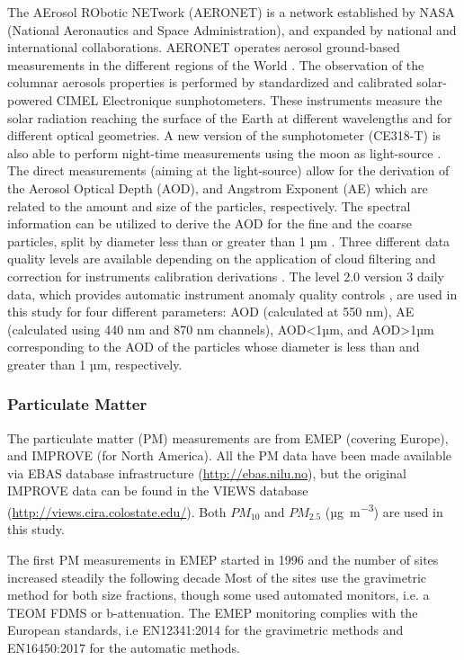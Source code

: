 \documentclass[journal abbreviation, manuscript]{copernicus}
\begin{document}
The AErosol RObotic NETwork (AERONET) is a network established by NASA (National Aeronautics and Space Administration), and expanded by national and international collaborations. AERONET operates aerosol ground-based measurements in the different regions of the World \citep{holben2001emerging}. The observation of the columnar aerosols properties is performed by standardized and calibrated solar-powered CIMEL Electronique sunphotometers. These instruments measure the solar radiation reaching the surface of the Earth at different wavelengths and for different optical geometries. A new version of the sunphotometer (CE318-T) is also able to perform night-time measurements using the moon as light-source \citep{barreto2016new}. The direct measurements (aiming at the light-source) allow for the derivation of the Aerosol Optical Depth (AOD), and Angstrom Exponent (AE) which are related to the amount and size of the particles, respectively. The spectral information can be utilized to derive the AOD for the fine and the coarse particles, split by diameter less than or greater than 1 µm \citep{o2003spectral}. Three different data quality levels are available depending on the application of cloud filtering and correction for instruments calibration derivations \citep{smirnov2000cloud,smirnov2004aeronet}. The level 2.0 version 3 daily data, which provides automatic instrument anomaly quality controls \citep{giles2019advancements}, are used in this study for four different parameters:
AOD (calculated at 550 nm), AE (calculated using 440 nm and 870 nm channels), AOD<1µm, and AOD>1µm corresponding to the AOD of the particles whose diameter is less than and greater than 1 µm, respectively.

\subsubsection{Particulate Matter}
The particulate matter (PM) measurements are from EMEP (covering Europe), and IMPROVE (for North America). All the PM data have been made available via EBAS database infrastructure  (\url{http://ebas.nilu.no}), but the original IMPROVE data can be found in the VIEWS database (\url{http://views.cira.colostate.edu/}). Both $PM_{10}$ and $PM_{2.5}$ (\unit{µg.m^{-3}}) are used in this study.

The first PM measurements in EMEP started in 1996 and the number of sites increased steadily the following decade \citep{torseth2012} Most of the sites use the gravimetric method for both size fractions, though some used automated monitors, i.e. a TEOM FDMS or b-attenuation. The EMEP monitoring complies with the European standards, i.e EN12341:2014 for the gravimetric methods and  EN16450:2017 for the automatic methods. 
\end{document}

